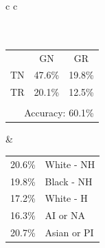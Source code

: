 \documentclass[sigconf]{acmart}
\begin{document}
\begin{figure}
  \centering
  
  \begin{tabular}{c c}
    \vspace{3mm} \\
     \\
    \vspace{-2mm} \\
    \begin{tabular}{c c c}
      & GN & GR \\ \cline{2-3}
      TN & \multicolumn{1}{|c|}{47.6\%} & \multicolumn{1}{|c|}{19.8\%} \\ \cline{2-3}
      TR & \multicolumn{1}{|c|}{20.1\%} & \multicolumn{1}{|c|}{12.5\%} \\ \cline{2-3}
       & & \vspace{-2mm} \\
      \multicolumn{3}{r}{Accuracy: 60.1\%} \\
    \end{tabular} & 
    \begin{tabular}{|c l|}
      \hline
      20.6\% & White - NH \\
      19.8\% & Black - NH \\
      17.2\% & White - H \\
      16.3\% & AI or NA \\
      20.7\% & Asian or PI \\
      \hline
    \end{tabular} \\
  \end{tabular}
 

\end{figure}
\end{document}
